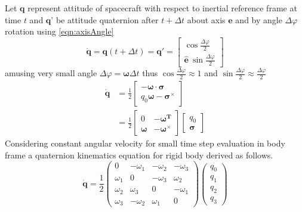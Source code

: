 Let $\displaystyle \mathbf{q}$ represent attitude of spacecraft with respect to inertial reference frame at time $\displaystyle t$ and $\displaystyle \mathbf{q}$' be attitude quaternion after $\displaystyle t+\Delta t$ about axis $\displaystyle \hat{\mathbf{e}}$ and by angle $\displaystyle \Delta \varphi $ rotation using \autoref{eqn:axisAngle}
\begin{equation}
\dot{\mathbf{q}} =\mathbf{q}( t+\Delta t) =\mathbf{q} '=\begin{bmatrix}
\cos\frac{\Delta \varphi }{2}\\
\hat{\mathbf{e}} \ \sin\frac{\Delta \varphi }{2}
\end{bmatrix}
\end{equation}
amusing very small angle $\displaystyle \Delta \varphi =\mathbf{\omega } \Delta t$ thus $\displaystyle \cos\frac{\Delta \varphi }{2} \approx 1$ and $\displaystyle \sin\frac{\Delta \varphi }{2} \approx \frac{\Delta \varphi }{2}$
\begin{equation}
\begin{aligned}
\dot{\mathbf{q}} & =\frac{1}{2}
\begin{bmatrix}
-\mathbf{\omega } \cdot \mathbf{\sigma }\\
 q_{0}\mathbf{\omega } -\mathbf{\sigma }^{\times }
\end{bmatrix}\\
 & =\frac{1}{2}\begin{bmatrix}
0 & -\mathbf{\omega^T }\\
\mathbf{\omega } & -\mathbf{\omega }^{\times }
\end{bmatrix}\begin{bmatrix}
q_{0}\\
\mathbf{\sigma }
\end{bmatrix}
\end{aligned}
\end{equation}
Considering constant angular velocity for small time step evaluation in body frame a quaternion kinematics equation for rigid body derived as follows.
\begin{equation}
\dot{\mathbf{q}} =\frac{1}{2}\begin{pmatrix}
0 & -\omega _{1} & -\omega _{2} & -\omega _{3}\\
\omega _{1} & 0 & -\omega _{3} & \omega _{2}\\
\omega _{2} & \omega _{3} & 0 & -\omega _{1}\\
\omega _{3} & -\omega _{2} & \omega _{1} & 0
\end{pmatrix}\begin{pmatrix}
q_{0}\\
q_{1}\\
q_{2}\\
q_{3}
\end{pmatrix}
\end{equation}
